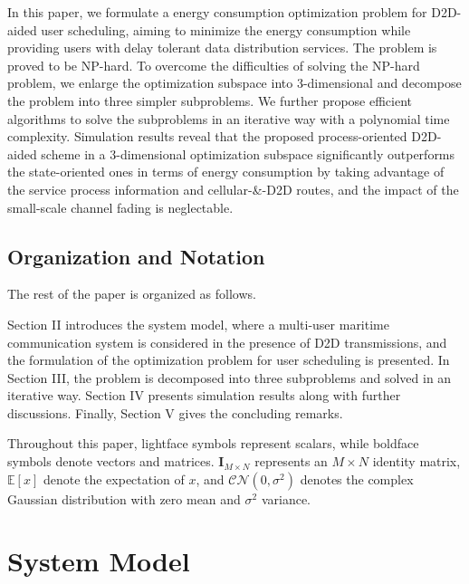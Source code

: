 \documentclass{ieeeaccess}
\begin{document}

In this paper, we formulate a energy consumption optimization problem for D2D-aided user scheduling, aiming to minimize the energy consumption while providing users with delay tolerant data distribution services. The problem is proved to be NP-hard. To overcome the difficulties of solving the NP-hard problem, we enlarge the optimization subspace into 3-dimensional and decompose the problem into three simpler subproblems. We further propose efficient algorithms to solve the subproblems in an iterative way with a polynomial time complexity.
Simulation results reveal that the proposed process-oriented D2D-aided scheme in a 3-dimensional optimization subspace significantly outperforms the state-oriented ones in terms of energy consumption by taking advantage of the service process information and cellular-\&-D2D routes, and the impact of the small-scale channel fading is neglectable. 


\subsection{Organization and Notation}
The rest of the paper is organized as follows.

Section II introduces the system model, where a multi-user maritime communication system is considered in the presence of D2D transmissions, and the formulation of the optimization problem for user scheduling is presented.
In Section III,  the problem is decomposed into three subproblems and solved in an iterative way.
Section IV presents simulation results along with further discussions.
Finally, Section V gives the concluding remarks.

Throughout this paper, lightface symbols represent scalars, while boldface symbols denote vectors and matrices. ${\mathbf{I}}_{M \times N}$ represents an ${M \times N}$ identity matrix, $\mathbb{E}[x]$ denote the expectation of $x$, and $\mathcal{CN}(0, {\sigma}^2)$ denotes the complex Gaussian distribution with zero mean and ${\sigma}^2$ variance. 



\section{System Model}
\end{document}
